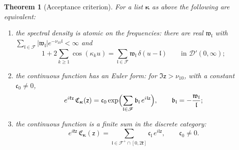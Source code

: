 \documentclass[11pt,reqno]{amsart}
\numberwithin{equation}{section}
\theoremstyle{plain}
\newtheorem{theorem}{Theorem}[section]
\theoremstyle{definition}
\theoremstyle{remark}
\begin{document}
\begin{theorem}[Acceptance criterion]\label{thm:acceptance}
For a list $\boldsymbol{\kappa}$ as above the following are equivalent:
\begin{enumerate}[label=\textup{(\roman*)}]
\item the spectral density is atomic on the frequencies: there are real $\mathfrak w_{\mathfrak l}$ with $\sum_{\mathfrak l\in\mathscr F}|\mathfrak w_{\mathfrak l}|e^{-\nu_{10}\mathfrak l}<\infty$ and
\begin{equation}\label{eq:acceptance-density}
 1+2\sum_{k\ge1}\cos(\kappa_ku)=\sum_{\mathfrak l\in\mathscr F}\mathfrak w_{\mathfrak l}\,\delta(u-\mathfrak l)\qquad\text{in }\mathcal D'(0,\infty);
\end{equation}
\item the continuous function has an Euler form: for $\Im\mathsf z>\nu_{10}$, with a constant $\mathfrak c_0\ne0$,
\begin{equation}\label{eq:acceptance-euler}
 e^{i\mathfrak k\mathsf z}\,\mathfrak C_{\boldsymbol{\kappa}}(\mathsf z)=\mathfrak c_0\exp\Bigl(\sum_{\mathfrak l\in\mathscr F}\mathfrak b_{\mathfrak l}\,e^{i\mathfrak l\mathsf z}\Bigr),\qquad\mathfrak b_{\mathfrak l}=-\frac{\mathfrak w_{\mathfrak l}}{\mathfrak l};
\end{equation}
\item the continuous function is a finite sum in the discrete category:
\begin{equation}\label{eq:acceptance-window}
 e^{i\mathfrak k\mathsf z}\,\mathfrak C_{\boldsymbol{\kappa}}(\mathsf z)=\sum_{\mathfrak l\in\mathscr F^{+}\cap[0,2\mathfrak k]}\mathfrak c_{\mathfrak l}\,e^{i\mathfrak l\mathsf z},\qquad\mathfrak c_0\ne0 .
\end{equation}
\end{enumerate}
\end{theorem}
\end{document}
